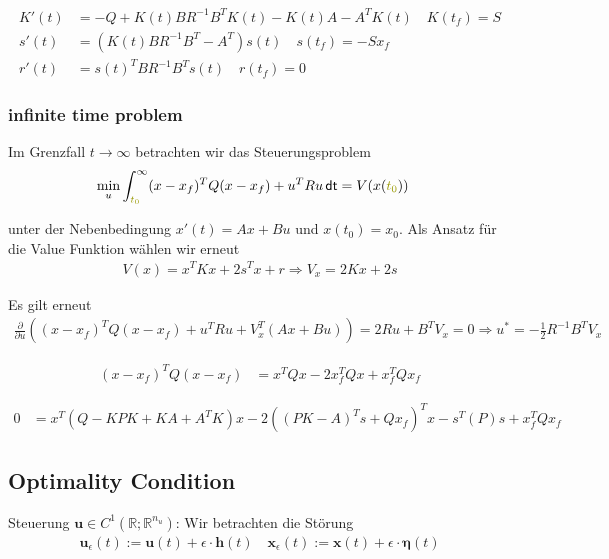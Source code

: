 \documentclass[a4paper, 12pt]{scrartcl}
\newcommand{\dunkelgelb}[2][dunkelgelb]{\textcolor{#1}{#2}}
\newcommand{\dt}{\thinspace \mathsf{dt}}
\begin{document}
\begin{align*}
    K'(t) &= -Q+K(t) B R^{-1} B^T K(t) - K(t) A - A^T K(t) \quad K(t_f) = S \\
    s'(t) &= (K(t) B R^{-1} B^T  - A^T) s(t) \quad s(t_f) = -S x_f  \\
    r'(t) &= s(t)^T B R^{-1} B^T s(t) \quad r(t_f) = 0
\end{align*}

\subsubsection{infinite time problem}

Im Grenzfall $t \to \infty$ betrachten wir das Steuerungsproblem
%
\begin{align*}
\min_u &  \int_{\dunkelgelb{t_0}}^{\infty} (x-x_f)^T Q (x-x_f)  + u^T R u \dt 
= V(x(\dunkelgelb{t_0}))
\end{align*}

unter der Nebenbedingung $x'(t) = Ax+Bu$ und $x(t_0) = x_0$. Als Ansatz für die Value Funktion wählen wir erneut 
%
\begin{align*}
V(x) = x^T K x + 2s^T x + r \Rightarrow V_x = 2Kx + 2s
\end{align*}

Es gilt erneut 
%
\begin{align*}
\frac{\partial}{\partial u} \left((x-x_f)^T Q (x-x_f)  + u^T R u  + V_x^T (Ax+Bu) \right) = 2Ru + B^T V_x  = 0 \Rightarrow u^{*} = -\frac{1}{2} R^{-1} B^T V_x 
\end{align*}


\begin{align*}
(x-x_f)^T Q (x-x_f) 
&= x^T Q x - 2 x_f^T Q x + x_f^T Q x_f
\end{align*}

\begin{align*}
0 &= x^T ( Q - KPK + KA + A^T K ) x -2 ((PK-A)^T s + Qx_f)^T x - s^T (P) s + x_f^T Q x_f
\end{align*}

\subsection{Optimality Condition}\label{Gradientherleitung_Optimal_Control}

Steuerung $\bm{u}\in C^1(\mathbb{R};\mathbb{R}^{n_u})$: Wir betrachten die Störung 
\begin{align*}
    \bm{u}_\epsilon(t) := \bm{u}(t) + \epsilon \cdot \bm{h}(t) 
    \quad
    \bm{x}_\epsilon(t) := \bm{x}(t) + \epsilon \cdot \bm{\eta}(t) 
\end{align*}
\end{document}
